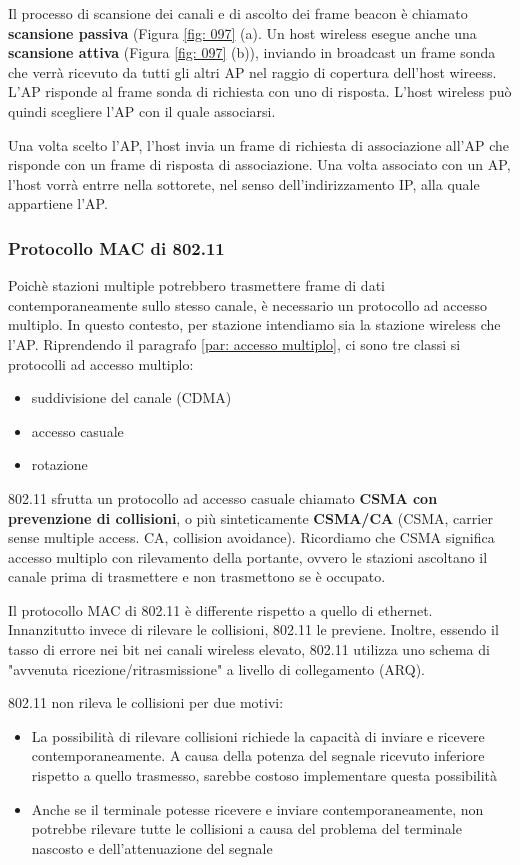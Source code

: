 \documentclass[11pt,a4paper]{article}
\begin{document}
Il processo di scansione dei canali e di ascolto dei frame beacon è chiamato \textbf{scansione passiva} (Figura \ref{fig: 097} (a). Un host wireless esegue anche una \textbf{scansione attiva} (Figura \ref{fig: 097} (b)), inviando in broadcast un frame sonda che verrà ricevuto da tutti gli altri AP nel raggio di copertura dell'host wireess. L'AP risponde al frame sonda di richiesta con uno di risposta. L'host wireless può quindi scegliere l'AP con il quale associarsi. 

Una volta scelto l'AP, l'host invia un frame di richiesta di associazione all'AP che risponde con un frame di risposta di associazione. Una volta associato con un AP, l'host vorrà entrre nella sottorete, nel senso dell'indirizzamento IP, alla quale appartiene l'AP.

\subsubsection{Protocollo MAC di 802.11}
Poichè stazioni multiple potrebbero trasmettere frame di dati contemporaneamente sullo stesso canale, è necessario un protocollo ad accesso multiplo. In questo contesto, per stazione intendiamo sia la stazione wireless che l'AP. Riprendendo il paragrafo \ref{par: accesso multiplo}, ci sono tre classi si protocolli ad accesso multiplo:
\begin{itemize}
	\item suddivisione del canale (CDMA)
	\item accesso casuale
	\item rotazione
\end{itemize}
802.11 sfrutta un protocollo ad accesso casuale chiamato \textbf{CSMA con prevenzione di collisioni}, o più sinteticamente \textbf{CSMA/CA} (CSMA, carrier sense multiple access. CA, collision avoidance). Ricordiamo che CSMA significa accesso multiplo con rilevamento della portante, ovvero le stazioni ascoltano il canale prima di trasmettere e non trasmettono se è occupato.

Il protocollo MAC di 802.11 è differente rispetto a quello di ethernet. Innanzitutto invece di rilevare le collisioni, 802.11 le previene. Inoltre, essendo il tasso di errore nei bit nei canali wireless elevato, 802.11 utilizza uno schema di "avvenuta ricezione/ritrasmissione"  a livello di collegamento (ARQ).

802.11 non rileva le collisioni per due motivi:
\begin{itemize}
	\item La possibilità di rilevare collisioni richiede la capacità di inviare e ricevere contemporaneamente. A causa della potenza del segnale ricevuto inferiore rispetto a quello trasmesso, sarebbe costoso implementare questa possibilità
	\item Anche se il terminale potesse ricevere e inviare contemporaneamente, non potrebbe rilevare tutte le collisioni a causa del problema del terminale nascosto e dell'attenuazione del segnale
\end{itemize}
\end{document}
